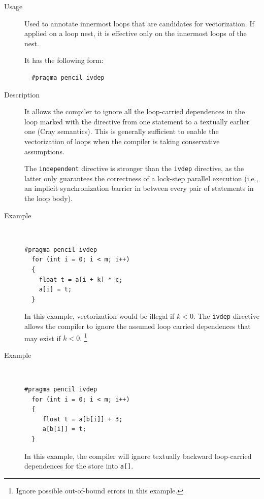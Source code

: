 \documentclass{carp}
\newcommand\pencil{\textsc{Pencil}\xspace}
\begin{document}
\begin{description}
\item [Usage] Used to annotate innermost loops that are candidates
  for vectorization.  If applied on a loop nest, it is effective only on
  the innermost loops of the nest.

  It has the following form:
  \begin{lstlisting}
  #pragma pencil ivdep
  \end{lstlisting}
\item [Description] It allows the
  compiler to ignore all the loop-carried dependences in the loop marked with
  the directive from one statement to a textually earlier one (Cray semantics).
  This is generally sufficient to enable the vectorization
  of loops when the compiler is taking conservative assumptions.

  The \lstinline!independent!  directive is stronger than the
  \lstinline!ivdep! directive, as the latter only guarantees the
  correctness of a lock-step parallel execution (i.e., an implicit
  synchronization barrier in between every pair of statements in the loop
  body).
  
  \item [Example]~

  \begin{lstlisting}[language=pencil]
  #pragma pencil ivdep
  for (int i = 0; i < m; i++)
  {
    float t = a[i + k] * c;
    a[i] = t;
  }
  \end{lstlisting}
  In this example, vectorization would be illegal if $k < 0$.  The
  \lstinline!ivdep! directive allows the compiler to ignore the assumed
  loop carried dependences that may exist if $k < 0$. \footnote{Ignore
  possible out-of-bound errors in this example.}
  \item [Example]~
  \begin{lstlisting}[language=pencil]
  #pragma pencil ivdep
  for (int i = 0; i < m; i++)
  {
     float t = a[b[i]] + 3;
     a[b[i]] = t;
  }
  \end{lstlisting}
  In this example, the compiler will ignore textually backward
  loop-carried dependences for the store into \lstinline!a[]!.
\end{description}
%
\end{document}
